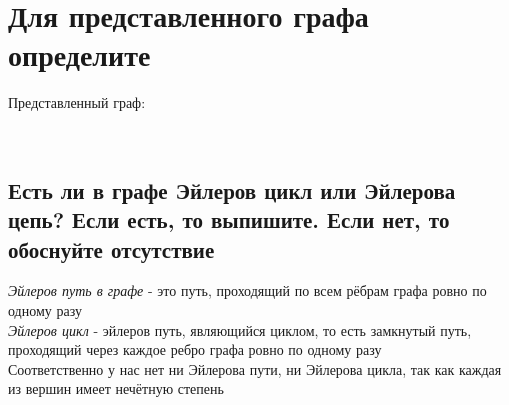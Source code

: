 \documentclass{article}
\begin{document}
    \section{Для представленного графа определите}
        Представленный граф:
        \begin{figure}[h!]
        \end{figure}\\
        \subsection{Есть ли в графе Эйлеров цикл или Эйлерова цепь? Если есть, то выпишите. Если нет, то обоснуйте отсутствие}
            \textit{Эйлеров путь в графе} - это путь, проходящий по всем рёбрам графа ровно по одному разу\\
            \textit{Эйлеров цикл} - эйлеров путь, являющийся циклом, то есть замкнутый путь, проходящий через каждое ребро графа ровно по одному разу\\
            Соответственно у нас нет ни Эйлерова пути, ни Эйлерова цикла, так как каждая из вершин имеет нечётную степень
\end{document}
